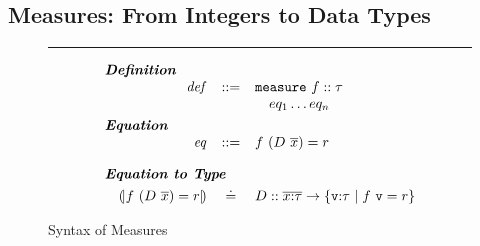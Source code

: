 \newcommand\hnull{\ensuremath{\text{[]}}\xspace}

\subsection{Measures: From Integers to Data Types}\label{sec:measures}

\begin{figure}
\hrule width 0.48\textwidth \vspace{0.05in}
$$
\begin{array}{rcl}
\multicolumn{3}{l}{\emphbf{Definition}}               \\
  \mathit{def} & ::=  &  \mathtt{measure} \ f :: \tau \\
               &      &  \quad eq_1 \ldots eq_n       \\[0.05in]

\multicolumn{3}{l}{\emphbf{Equation}}                 \\ 
  \mathit{eq}  & ::=  &   f\ (D\ \overline{x}) = r    \\[0.15in] 

\multicolumn{3}{l}{\emphbf{Equation to Type}}         \\[0.05in]
\quad \embed{f\ (D\ \overline{x}) = r} & \defeq & D :: \overline{\tbind{x}{\tau}} \rightarrow \tref{\mathtt{v}}{\tau}{}{f\ \mathtt{v} = r}
\end{array}
$$
\caption{Syntax of Measures}
\label{fig:measures}
\end{figure}



